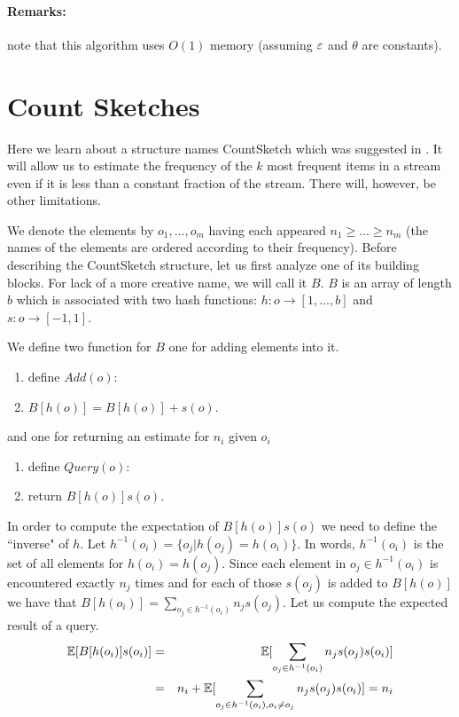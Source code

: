\documentclass{article}
\begin{document}
\paragraph{Remarks:}
note that this algorithm uses $O(1)$ memory (assuming $\varepsilon$ and $\theta$ are constants).



\section*{Count Sketches}

Here we learn about a structure names CountSketch which was suggested in \cite{Charikar02findingfrequent}. 
It will allow us to estimate the frequency of the $k$ most frequent items in a stream even if it is less than a constant fraction of the stream.
There will, however, be other limitations.

We denote the elements by $o_1,\ldots,o_m$ having each appeared $n_1 \ge \ldots \ge n_m$
(the names of the elements are ordered according to their frequency).
Before describing the CountSketch structure, let us first analyze one of its building blocks.
For lack of a more creative name, we will call it $B$.
$B$ is an array of length $b$ which is associated with two hash functions:
$h: o \rightarrow [1,\ldots,b]$ and $s: o \rightarrow [-1,1]$.
  
We define two function for $B$ one for adding elements into it.
\begin{enumerate}
\item define $Add(o)$:
\item \tab $B[h(o)] = B[h(o)] + s(o)$. 
\end{enumerate} 
and one for returning an estimate for $n_i$ given $o_i$
\begin{enumerate}
\item define $Query(o)$:
\item \tab return $B[h(o)]s(o)$. 
\end{enumerate} 

In order to compute the expectation of $B[h(o)]s(o)$ we need to define the ``inverse" of $h$. 
Let $h^{-1}(o_i) = \{o_j | h(o_j) = h(o_i)\}$. In words, $h^{-1}(o_i)$ is the set of all elements for $h(o_i)=h(o_j)$.
Since each element in $o_j \in h^{-1}(o_i)$ is encountered exactly $n_j$ times and for each of those $s(o_j)$ is added to $B[h(o)]$
we have that $B[h(o_i)] = \sum_{o_j \in h^{-1}(o_i)} n_j s(o_j)$. Let us compute the expected result of a query.
\begin{eqnarray*}
{\mathbb E}[B[h(o_i)]s(o_i)] &=& {\mathbb E}[\sum_{o_j \in h^{-1}(o_i)} n_j s(o_j)s(o_i)] \\
&=& n_i + {\mathbb E}[\sum_{o_j \in h^{-1}(o_i),o_i \ne o_j} n_j s(o_j)s(o_i)] = n_i
\end{eqnarray*}
\end{document}
